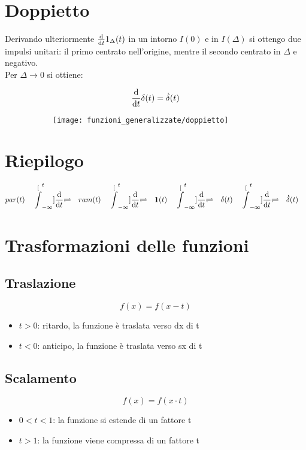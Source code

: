 \documentclass[../main.tex]{subfiles}
\begin{document}
	\section{Doppietto}
		Derivando ulteriormente $\frac{\mathrm{d} }{\mathrm{d} t}1_{\Delta}(t)$ in un intorno $I(0)$ e in $I(\Delta)$ si ottengo due impulsi unitari: il primo centrato nell'origine, mentre il secondo centrato in $\Delta$ e negativo.\\
		Per $\Delta \longrightarrow 0$ si ottiene:
		\begin{figure}[H]
			\centering
			\begin{subfigure}{0.5\textwidth}
				\[
					\frac{\mathrm{d} }{\mathrm{d} t} \delta(t) = \dot{\delta}(t)
				\]
			\end{subfigure}
			\begin{subfigure}{0.4\textwidth}
				\texttt{[image: funzioni\_generalizzate/doppietto]}
			\end{subfigure}
		\end{figure}
		
	\section{Riepilogo}
		\[
			par(t) \quad \stackrel[\int_{-\infty}^{t}]{\frac{\mathrm{d} }{\mathrm{d} t}}{\rightleftharpoons} 
			\quad ram(t) \quad
			\stackrel[\int_{-\infty}^{t}]{\frac{\mathrm{d} }{\mathrm{d} t}}{\rightleftharpoons}
			\quad \textbf{1}(t) \quad
			\stackrel[\int_{-\infty}^{t}]{\frac{\mathrm{d} }{\mathrm{d} t}}{\rightleftharpoons}
			\quad \delta (t) \quad
			\stackrel[\int_{-\infty}^{t}]{\frac{\mathrm{d} }{\mathrm{d} t}}{\rightleftharpoons}
			\quad \dot{\delta}(t) \quad
		\]
		
	\section{Trasformazioni delle funzioni}
	
	\subsection{Traslazione}
		$$ f(x) = f(x - t) $$
		\begin{itemize}
			\item $ t>0 $: ritardo, la funzione è traslata verso dx di t
			\item $ t<0 $: anticipo, la funzione è traslata verso sx di t 	
		\end{itemize}
		
	\subsection{Scalamento}
		$$ f(x) = f(x \cdot t) $$
		\begin{itemize}
			\item $ 0<t<1 $: la funzione si estende di un fattore t
			\item $ t>1 $: la funzione viene compressa di un fattore t  	
		\end{itemize}
		
\end{document}
